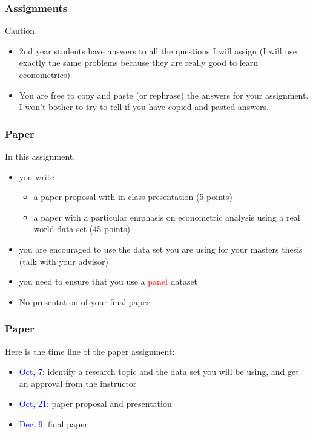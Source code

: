 \documentclass[fleqn]{beamer}\usepackage[]{graphicx}\usepackage[]{color}
\begin{document}
\begin{frame}[c]
  \frametitle{Assignments}
  \begin{block}{Caution}
    \begin{itemize}
      \item 2nd year students have answers to all the questions I will assign (I will use exactly the same problems because they are really good to learn econometrics)
      \item You are free to copy and paste (or rephrase) the answers for your assignment. I won't bother to try to tell if you have copied and pasted answers.
    \end{itemize}
  \end{block}
\end{frame}

\begin{frame}[c]
  \frametitle{Paper}
  In this assignment,
  \begin{itemize}
    \item you write 
    \begin{itemize}
      \item a paper proposal with in-class presentation (5 points)
      \item a paper with a particular emphasis on econometric analysis using a real world data set (45 points)
    \end{itemize}
    \item you are encouraged to use the data set you are using for your masters thesis (talk with your advisor)
    \item you need to ensure that you use a \textcolor{red}{panel} dataset
    \item No presentation of your final paper
  \end{itemize}
\end{frame}

\begin{frame}[c]
  \frametitle{Paper}
  Here is the time line of the paper assignment:
  \begin{itemize}
    \item \textcolor{blue}{Oct, 7}: identify a research topic and the data set you will be using, and get an approval from the instructor
    \item \textcolor{blue}{Oct, 21}: paper proposal and presentation
    \item \textcolor{blue}{Dec, 9}: final paper 
  \end{itemize}
\end{frame}
\end{document}
